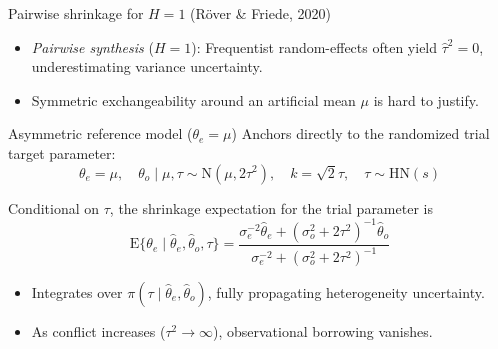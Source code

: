 \documentclass[t]{beamer}
\newcommand{\E}{\mathrm{E}}
\begin{document}
\begin{frame}{Pairwise shrinkage for $H = 1$ (R\"over \& Friede, 2020)}
    \begin{itemize}
        \item \emph{Pairwise synthesis} ($H=1$): Frequentist random-effects often yield $\hat\tau^2 = 0$, underestimating variance uncertainty.
        \item Symmetric exchangeability around an artificial mean $\mu$ is hard to justify.
    \end{itemize}

    \begin{block}{Asymmetric reference model ($\theta_e = \mu$)}
    Anchors directly to the randomized trial target parameter:
    \begin{equation*}
        \theta_e = \mu, \quad \theta_o \mid \mu, \tau \sim \text{N}(\mu, 2\tau^2), \quad  k=\sqrt{2}\tau, \quad \tau \sim \text{HN}(s)
    \end{equation*}
    \end{block}

    Conditional on $\tau$, the shrinkage expectation for the trial parameter is
    \begin{equation*}
        \E\{\theta_e \mid \hat\theta_e, \hat\theta_o, \tau\} = \frac{\sigma_e^{-2} \hat\theta_e + (\sigma_o^2 + 2\tau^2)^{-1} \hat\theta_o}{\sigma_e^{-2} + (\sigma_o^2 + 2\tau^2)^{-1}}
    \end{equation*}

    \begin{itemize}
        \item Integrates over $\pi(\tau \mid \hat\theta_e, \hat\theta_o)$, fully propagating heterogeneity uncertainty.
        \item As conflict increases ($\tau^2 \to \infty$), observational borrowing vanishes.
    \end{itemize}
\end{frame}
\end{document}
